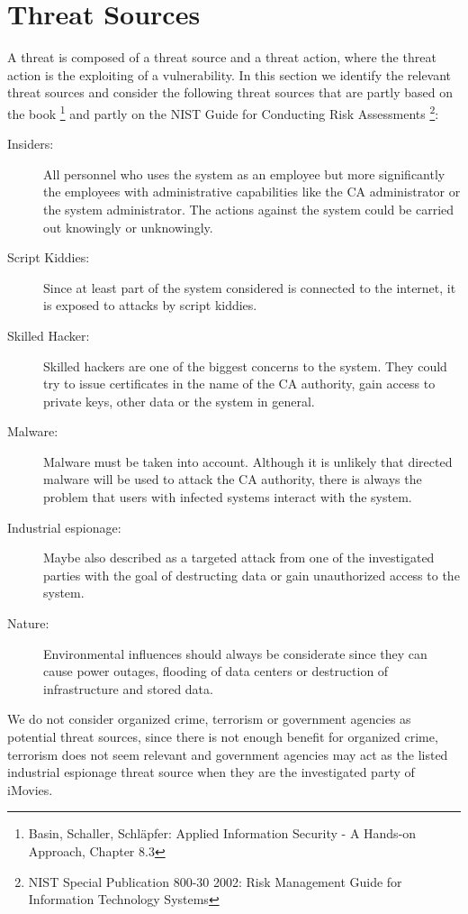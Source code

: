 \documentclass[a4paper, toc=index, 12pt, DIV14, twoside, BCOR2cm, headsepline, numbers=noenddot, bibliography=totoc]{scrbook}
\begin{document}
\section{Threat Sources}
A threat is composed of a threat source and a threat action, where the threat action is the exploiting of a vulnerability. In this section we identify the relevant threat sources and consider the following threat sources that are partly based on the book \footnote{Basin, Schaller, Schläpfer: Applied Information Security - A Hands-on Approach, Chapter 8.3} and partly on the NIST Guide for Conducting Risk Assessments \footnote{NIST Special Publication 800-30 2002: Risk Management Guide for Information Technology Systems}:
\begin{description}
\item[Insiders:] All personnel who uses the system as an employee but more significantly the employees with administrative capabilities like the CA administrator or the system administrator. The actions against the system could be carried out knowingly or unknowingly.

\item[Script Kiddies:] Since at least part of the system considered is connected to the internet, it is exposed to attacks by script kiddies.

\item[Skilled Hacker:] Skilled hackers are one of the biggest concerns to the system. They could try to issue certificates in the name of the CA authority, gain access to private keys, other data or the system in general.

\item[Malware:] Malware must be taken into account. Although it is unlikely that directed malware will be used to attack the CA authority, there is always the problem that users with infected systems interact with the system.

\item[Industrial espionage: ] Maybe also described as a targeted attack from one of the investigated parties with the goal of destructing data or gain unauthorized access to the system.

\item[Nature: ] Environmental influences should always be considerate since they can cause power outages, flooding of data centers or destruction of infrastructure and stored data.
\end{description}
We do not consider organized crime, terrorism or government agencies as potential threat sources, since there is not enough benefit for organized crime, terrorism does not seem relevant and government agencies may act as the listed industrial espionage threat source when they are the investigated party of iMovies.
\end{document}
